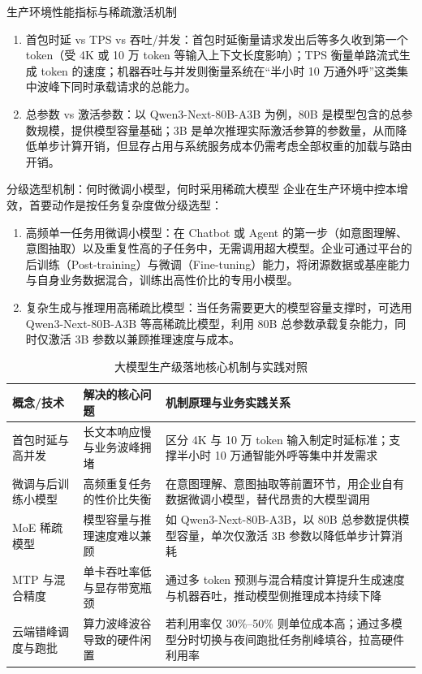 \documentclass[UTF8,a4paper,11pt,fontset=fandol]{ctexart}
\begin{document}
\begin{knowledgebox}{生产环境性能指标与稀疏激活机制}
\begin{enumerate}
\item 首包时延 vs TPS vs 吞吐/并发：首包时延衡量请求发出后等多久收到第一个 token（受 4K 或 10 万 token 等输入上下文长度影响）；TPS 衡量单路流式生成 token 的速度；机器吞吐与并发则衡量系统在“半小时 10 万通外呼”这类集中波峰下同时承载请求的总能力。
\item 总参数 vs 激活参数：以 Qwen3-Next-80B-A3B 为例，80B 是模型包含的总参数规模，提供模型容量基础；3B 是单次推理实际激活参算的参数量，从而降低单步计算开销，但显存占用与系统服务成本仍需考虑全部权重的加载与路由开销。
\end{enumerate}
\end{knowledgebox}
\begin{warningbox}{分级选型机制：何时微调小模型，何时采用稀疏大模型}
企业在生产环境中控本增效，首要动作是按任务复杂度做分级选型：
\begin{enumerate}
\item 高频单一任务用微调小模型：在 Chatbot 或 Agent 的第一步（如意图理解、意图抽取）以及重复性高的子任务中，无需调用超大模型。企业可通过平台的后训练（Post-training）与微调（Fine-tuning）能力，将闭源数据或基座能力与自身业务数据混合，训练出高性价比的专用小模型。
\item 复杂生成与推理用高稀疏比模型：当任务需要更大的模型容量支撑时，可选用 Qwen3-Next-80B-A3B 等高稀疏比模型，利用 80B 总参数承载复杂能力，同时仅激活 3B 参数以兼顾推理速度与成本。
\end{enumerate}
\end{warningbox}
\begin{table}[H]\centering\small
\caption{大模型生产级落地核心机制与实践对照}
\begin{tabular}{>{\raggedright\arraybackslash}p{\dimexpr(\linewidth-6\tabcolsep)/3\relax}>{\raggedright\arraybackslash}p{\dimexpr(\linewidth-6\tabcolsep)/3\relax}>{\raggedright\arraybackslash}p{\dimexpr(\linewidth-6\tabcolsep)/3\relax}}
\toprule
概念/技术 & 解决的核心问题 & 机制原理与业务实践关系\\\midrule
首包时延与高并发 & 长文本响应慢与业务波峰拥堵 & 区分 4K 与 10 万 token 输入制定时延标准；支撑半小时 10 万通智能外呼等集中并发需求\\[4pt]
微调与后训练小模型 & 高频重复任务的性价比失衡 & 在意图理解、意图抽取等前置环节，用企业自有数据微调小模型，替代昂贵的大模型调用\\[4pt]
MoE 稀疏模型 & 模型容量与推理速度难以兼顾 & 如 Qwen3-Next-80B-A3B，以 80B 总参数提供模型容量，单次仅激活 3B 参数以降低单步计算消耗\\[4pt]
MTP 与混合精度 & 单卡吞吐率低与显存带宽瓶颈 & 通过多 token 预测与混合精度计算提升生成速度与机器吞吐，推动模型侧推理成本持续下降\\[4pt]
云端错峰调度与跑批 & 算力波峰波谷导致的硬件闲置 & 若利用率仅 30\%–50\% 则单位成本高；通过多模型分时切换与夜间跑批任务削峰填谷，拉高硬件利用率\\[4pt]
\bottomrule\end{tabular}\end{table}
\end{document}
